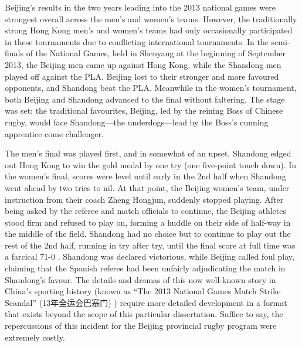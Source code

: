 \begin{CJK}{UTF8}{gbsn}
Beijing's results in the two years leading into the 2013 national games were strongest overall across the men's and women's teams.   However, the traditionally strong Hong Kong men's and women's teams had only occasionally participated in these tournaments due to conflicting international tournaments.  In the semi-finals of the National Games, held in Shenyang at the beginning of September 2013, the Beijing men came up against Hong Kong, while the Shandong men played off against the PLA.  Beijing lost to their stronger and more favoured opponents, and Shandong beat the PLA.  Meanwhile in the women's tournament, both Beijing and Shandong advanced to the final without faltering.  The stage was set: the traditional favourites, Beijing, led by the reining Boss of Chinese rugby, would face Shandong---the underdogs---lead by the Boss's cunning apprentice come challenger.

The men's final was played first, and in somewhat of an upset, Shandong edged out Hong Kong to win the gold medal by one try (one five-point touch down).  In the women's final, scores were level until early in the 2nd half when Shandong went ahead by two tries to nil.  At that point, the Beijing women's team, under instruction from their coach Zheng Hongjun, suddenly stopped playing.  After being asked by the referee and match officials to continue, the Beijing athletes stood firm and refused to play on, forming a huddle on their side of half-way in the middle of the field. Shandong had no choice but to continue to play out the rest of the 2nd half, running in try after try, until the final score at full time was a farcical 71-0 \citep{Sina2013}.  Shandong was declared victorious, while Beijing called foul play, claiming that the Spanish referee had been unfairly adjudicating the match in Shandong's favour.  The details and dramas of this now well-known story in China's sporting history (known as ``The 2013 National Games Match Strike Scandal'' (13年全运会巴塞门) ) require more detailed development in a format that exists beyond the scope of this particular dissertation.  Suffice to say, the repercussions of this incident for the Beijing provincial rugby program were extremely costly.


\end{CJK}
